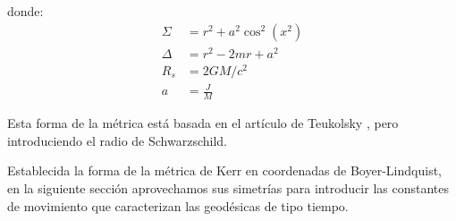 donde:
\begin{align}
    \Sigma &= r^2 + a^2 \cos^2(x^2) \\
    \Delta &= r^2 - 2mr + a^2 \\
    R_s &= 2GM/c^2 \\
    a &= \frac{J}{M}
\end{align}

Esta forma de la métrica está basada en el artículo de Teukolsky \cite{teukolsky2015kerr}, pero introduciendo el radio de Schwarzschild.

Establecida la forma de la métrica de Kerr en coordenadas de Boyer-Lindquist, en la siguiente sección aprovechamos sus simetrías para introducir las constantes de movimiento que caracterizan las geodésicas de tipo tiempo.

